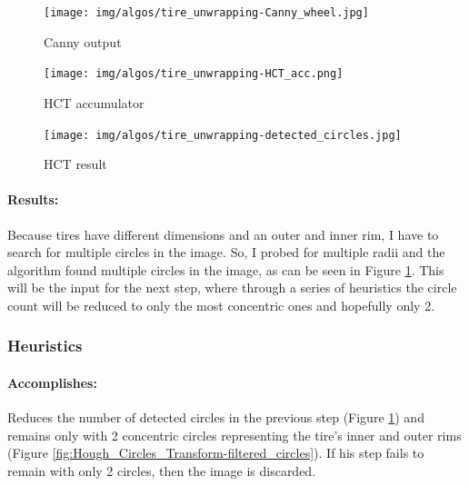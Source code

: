 \begin{figure}
    \centering
    \begin{minipage}[c]{0.33\linewidth}
        \centering
        \texttt{[image: img/algos/tire\_unwrapping-Canny\_wheel.jpg]}
            \caption{Canny output}
            \label{fig:canny_output_tire}
    \end{minipage}\hfill
    \begin{minipage}[c]{0.33\linewidth}
        \centering
        \texttt{[image: img/algos/tire\_unwrapping-HCT\_acc.png]}
            \caption{HCT accumulator}
            \label{fig:Hough_circle_accumulator}
    \end{minipage}\hfill
    \begin{minipage}[c]{0.33\linewidth}
        \centering
        \texttt{[image: img/algos/tire\_unwrapping-detected\_circles.jpg]}
        \caption{HCT result}
        \label{fig:Hough-Circles-Transform_result}
    \end{minipage}\hfill
\end{figure}

\paragraph*{Results:}\mbox{}\par
Because tires have different dimensions and an outer and inner rim, I have to search for multiple circles in the image. So, I probed for multiple radii and the algorithm found multiple circles in the image, as can be seen in Figure \ref{fig:Hough-Circles-Transform_result}. This will be the input for the next step, where through a series of heuristics the circle count will be reduced to only the most concentric ones and hopefully only 2.


\subsubsection{Heuristics}
\label{subsubsec:circ_det_heuristics}

\paragraph*{Accomplishes:}\mbox{}\par
Reduces the number of detected circles in the previous step (Figure \ref{fig:Hough-Circles-Transform_result}) and remains only with 2 concentric circles representing the tire's inner and outer rims (Figure \ref{fig:Hough_Circles_Transform-filtered_circles}). If his step fails to remain with only 2 circles, then the image is discarded.

